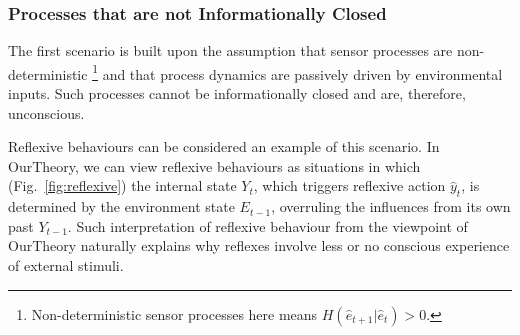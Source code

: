 \documentclass[utf8]{article}
\begin{document}
            \subsubsection*{Processes that are not Informationally Closed}\label{sec:reflexive}
                The first scenario is built upon the assumption that sensor processes are non-deterministic \footnote{Non-deterministic sensor processes here means $H(\hat{e}_{t+1}|\hat{e}_t)>0$.} and that process dynamics are passively driven by  environmental inputs. Such processes cannot be informationally closed and are, therefore, unconscious.
                
                Reflexive behaviours \citep{casali2013theoretically} can be considered an example of this scenario. In \ac{OurTheory}, we can view reflexive behaviours as situations in which (Fig.~\ref{fig:reflexive}) the internal state $Y_t$, which triggers reflexive action $\hat{y}_t$, is determined by the environment state $E_{t-1}$, overruling the influences from its own past $Y_{t-1}$. Such interpretation of reflexive behaviour from the viewpoint of \ac{OurTheory} naturally explains why reflexes involve less or no conscious experience of external stimuli.
                
\end{document}
